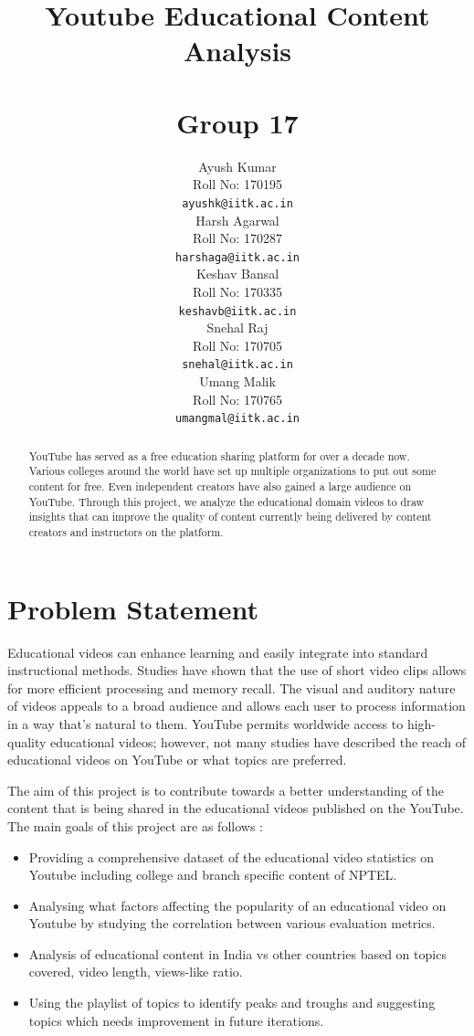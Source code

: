 \documentclass{article}
\title{Youtube Educational Content Analysis\\\\
\large{Group 17}}
\author{%
  Ayush Kumar\\
Roll No: 170195\\
  \texttt{ayushk@iitk.ac.in} \\
   \And
   Harsh Agarwal \\
Roll No: 170287\\
   \texttt{harshaga@iitk.ac.in} \\
   \AND
   Keshav Bansal\\
Roll No: 170335\\
  \texttt{keshavb@iitk.ac.in} \\
   \And
   Snehal Raj\\
Roll No: 170705\\
  \texttt{snehal@iitk.ac.in} \\
   \And
  Umang Malik\\
Roll No: 170765\\
  \texttt{umangmal@iitk.ac.in} \\
}
\begin{document}
\maketitle

\begin{abstract}
YouTube has served as a free education sharing platform for over a decade now. Various colleges around the world have set up multiple organizations to put out some content for free. Even independent creators have also gained a large audience on YouTube. Through this project, we analyze the educational domain videos to draw insights that can improve the quality of content currently being delivered by content creators and instructors on the platform.
\end{abstract}
\section{Problem Statement}
Educational videos can enhance learning and easily integrate into standard instructional methods. Studies have shown that the use of short video clips allows for more efficient processing and memory recall. The visual and auditory nature of videos appeals to a broad audience and allows each user to process information in a way that’s natural to them. YouTube permits worldwide access to high-quality educational videos; however, not many studies have described the reach of educational videos on YouTube or what topics are preferred. 

The aim of this project is to contribute towards a better understanding of the content that is being shared in the educational videos published on the YouTube. The main goals of this project are as follows :
\begin{itemize}
    
\item Providing a comprehensive dataset of the educational video statistics  on Youtube including college and branch specific content of NPTEL.
\item Analysing what factors affecting the popularity of an educational video on Youtube by studying the correlation between various evaluation metrics.
\item Analysis of  educational content in India vs other countries based on topics covered, video length, views-like ratio.
    \item Using the playlist of topics to identify peaks and troughs and suggesting topics which needs improvement in future iterations.
    
\end{itemize}
\end{document}
